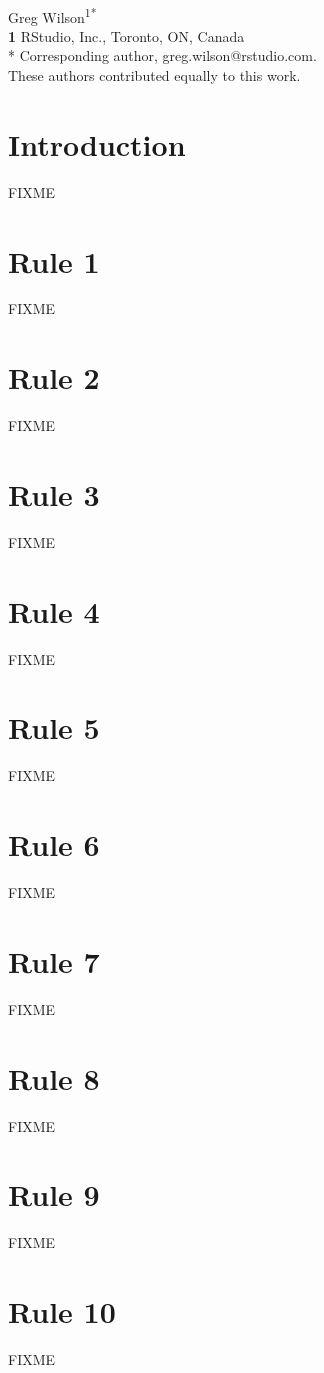 \documentclass[10pt,letterpaper]{article}
\newcommand{\rulemajor}[1]{\section*{#1}}
\begin{document}
\vspace*{0.2in}

\begin{flushleft}
{\Large
\textbf{}
}
\newline
\\
{Greg Wilson}\textsuperscript{1{\ddag}*}
\\
\bigskip
\textbf{1} RStudio, Inc., Toronto, ON, Canada\\
* Corresponding author, greg.wilson@rstudio.com. \\
\bigskip
{\ddag} These authors contributed equally to this work.
\end{flushleft}

\section*{Introduction}

FIXME

\rulemajor{Rule 1}

FIXME

\rulemajor{Rule 2}

FIXME

\rulemajor{Rule 3}

FIXME

\rulemajor{Rule 4}

FIXME

\rulemajor{Rule 5}

FIXME

\rulemajor{Rule 6}

FIXME

\rulemajor{Rule 7}

FIXME

\rulemajor{Rule 8}

FIXME

\rulemajor{Rule 9}

FIXME

\rulemajor{Rule 10}

FIXME

\nocite{*}

\end{document}
